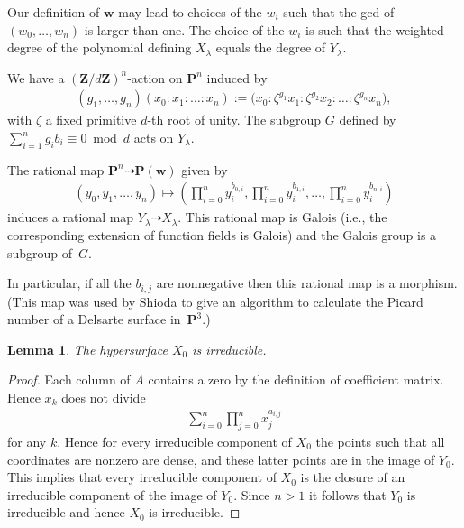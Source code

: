\documentclass[pdftex]{sigma}
\numberwithin{equation}{section}
\newtheorem{Lemma}[Theorem]{Lemma}
\begin{document}
\begin{Remark} Our def\/inition of $\mathbf{w}$ may lead to choices of the $w_i$ such that the gcd of $(w_0,\dots,w_n)$ is larger than one. The choice of the $w_i$ is such that the weighted degree of the polynomial def\/ining $X_{\lambda}$ equals the degree of $Y_\lambda$.
\end{Remark}

We have a $(\mathbf{Z}/d\mathbf{Z})^{n}$-action on $\mathbf{P}^n$ induced by
\begin{gather*} (g_1,\dots,g_n)(x_0:x_1:\dots:x_n):=\big(x_0:\zeta^{g_1}x_1:\zeta^{g_2}x_2:\dots:\zeta^{g_n}x_n\big),\end{gather*}
with $\zeta$ a f\/ixed primitive $d$-th root of unity. The subgroup $G$ def\/ined by $\sum\limits_{i=1}^n g_i b_i\equiv 0 \bmod d$ acts on $Y_{\lambda}$.

The rational map $\mathbf{P}^n\dashrightarrow \mathbf{P}(\mathbf{w})$ given by
\begin{gather*} (y_0,y_1,\dots,y_n) \mapsto \left(\prod_{i=0}^n y_i^{b_{0,i}},\prod_{i=0}^n y_i^{b_{1,i}},\dots,\prod_{i=0}^n y_i^{b_{n,i}}\right)\end{gather*}
induces a rational map $Y_{\lambda}\dashrightarrow X_{\lambda}$. This rational map is Galois (i.e., the corresponding extension of function f\/ields is Galois) and the Galois group is a subgroup of~$G$.

In particular, if all the $b_{i,j}$ are nonnegative then this rational map is a morphism. (This map was used by Shioda \cite{ShiExpPic} to give an algorithm to calculate the Picard number of a Delsarte surface in~$\mathbf{P}^3$.)

\begin{Lemma}
The hypersurface $X_0$ is irreducible.
\end{Lemma}
\begin{proof}
 Each column of $A$ contains a zero by the def\/inition of coef\/f\/icient matrix. Hence $x_k$ does not divide \begin{gather*}\sum_{i=0}^n \prod_{j=0}^n x_j^{a_{i,j}}\end{gather*}
for any $k$. Hence for every irreducible component of $X_0$ the points such that all coordinates are nonzero are dense, and these latter points are in the image of $Y_0$. This implies that every irreducible component of $X_0$ is the closure of an irreducible component of the image of $Y_0$. Since $n>1$ it follows that $Y_0$ is irreducible and hence $X_0$ is irreducible.
\end{proof}
\end{document}
